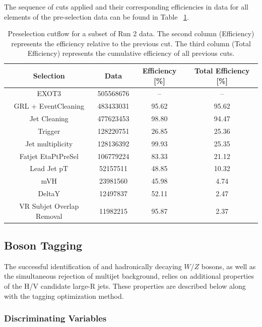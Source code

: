 The sequence of cuts applied and their corresponding efficiencies in data for all elements of the pre-selection data can be found in Table ~\ref{tab:data_cutflow}.

\begin{table}[htbp!]
\normalsize
\centering
\begin{tabular}{c||ccc}
    Selection & Data & Efficiency [\%] & Total Efficiency [\%] \\ \hline
    EXOT3                     & 505568676 & --    & -- \\ \hline
    GRL + EventCleaning       & 483433031 & 95.62 & 95.62 \\ \hline
    Jet Cleaning              & 477623453 & 98.80 & 94.47 \\ \hline
    Trigger                   & 128220751 & 26.85 & 25.36 \\ \hline
    Jet multiplicity          & 128136392 & 99.93 & 25.35 \\ \hline
    Fatjet EtaPtPreSel        & 106779224 & 83.33 & 21.12 \\ \hline
    Lead Jet pT               & 52157511  & 48.85 & 10.32 \\ \hline
    mVH                       & 23981560  & 45.98 & 4.74 \\ \hline
    DeltaY                    & 12497837  & 52.11 & 2.47 \\ \hline
    VR Subjet Overlap Removal & 11982215  & 95.87 & 2.37 \\
\end{tabular}
\caption{
    Preselection cutflow for a subset of Run 2 data.
    The second column (Efficiency) represents the efficiency relative to the previous cut.
    The third column (Total Efficiency) represents the cumulative efficiency of all previous cuts.
}
\label{tab:data_cutflow}
\end{table}
 
\subsection{Boson Tagging}

The successful identification of \Hbb and hadronically decaying $W$/$Z$ bosons, as well as the simultaneous rejection of multijet background, relies on additional properties of the H/V candidate large-R jets. These properties are described below along with the tagging optimization method.

\subsubsection{Discriminating Variables}

